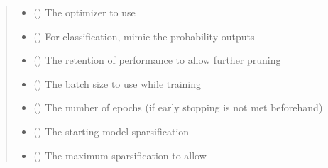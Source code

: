 \documentclass[letterpaper,10pt,english]{sphinxmanual}
\begin{document}
\begin{fulllineitems}
\begin{quote}
\begin{description}
\begin{itemize}
\item {} 
\sphinxAtStartPar
{} () \textendash{} The optimizer to use

\item {} 
\sphinxAtStartPar
{} (\sphinxstyleliteralemphasis{\sphinxupquote{ (}}\sphinxstyleliteralemphasis{\sphinxupquote{)}}) \textendash{} For classification, mimic the probability outputs

\item {} 
\sphinxAtStartPar
{} (\sphinxstyleliteralemphasis{\sphinxupquote{ (}}\sphinxstyleliteralemphasis{\sphinxupquote{)}}) \textendash{} The retention of performance to allow further pruning

\item {} 
\sphinxAtStartPar
{} (\sphinxstyleliteralemphasis{\sphinxupquote{ (}}\sphinxstyleliteralemphasis{\sphinxupquote{)}}) \textendash{} The batch size to use while training

\item {} 
\sphinxAtStartPar
{} (\sphinxstyleliteralemphasis{\sphinxupquote{ (}}\sphinxstyleliteralemphasis{\sphinxupquote{)}}) \textendash{} The number of epochs (if early stopping is not met beforehand)

\item {} 
\sphinxAtStartPar
{} (\sphinxstyleliteralemphasis{\sphinxupquote{ (}}\sphinxstyleliteralemphasis{\sphinxupquote{)}}) \textendash{} The starting model sparsification

\item {} 
\sphinxAtStartPar
{} (\sphinxstyleliteralemphasis{\sphinxupquote{ (}}\sphinxstyleliteralemphasis{\sphinxupquote{)}}) \textendash{} The maximum sparsification to allow


\end{itemize}
\end{description}
\end{quote}
\end{fulllineitems}
\end{document}
